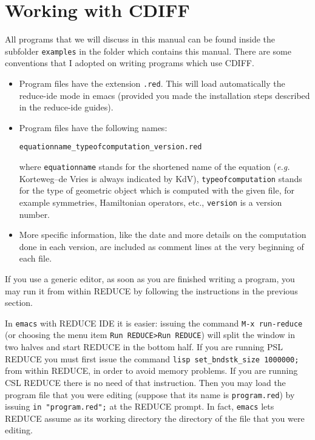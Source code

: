 \documentclass[12pt]{amsart}
\theoremstyle{definition}
\newcommand{\cdiff}{CDIFF\xspace}
\newcommand{\reduce}{REDUCE\xspace}
\begin{document}
\section{Working with \cdiff}

All programs that we will discuss in this manual can be found inside the
subfolder \texttt{examples} in the folder which contains this manual.  There
are some conventions that I adopted on writing programs which use \cdiff.
\begin{itemize}
\item Program files have the extension \texttt{.red}. This will load
  automatically the reduce-ide mode in emacs (provided you made the
  installation steps described in the reduce-ide guides).
\item Program files have the following names:
  \begin{center}
    \texttt{equationname\_typeofcomputation\_version.red}
  \end{center}
  where \texttt{equationname} stands for the shortened name of the equation
  (\emph{e.g.} Korteweg--de Vries is always indicated by KdV),
  \texttt{typeofcomputation} stands for the type of geometric object which is
  computed with the given file, for example symmetries, Hamiltonian operators,
  etc., \texttt{version} is a version number.
\item More specific information, like the date and more details on the
  computation done in each version, are included as comment lines at the very
  beginning of each file.
\end{itemize}

If you use a generic editor, as soon as you are finished writing a program, you
may run it from within \reduce by following the instructions in the previous
section.

In \texttt{emacs} with \reduce IDE it is easier: issuing the command
\texttt{M-x run-reduce} (or choosing the menu item \texttt{Run REDUCE>Run
  REDUCE}) will split the window in two halves and start \reduce in the bottom
half. If you are running PSL \reduce you must first issue the command
\texttt{lisp set\_bndstk\_size 1000000;} from within \reduce, in order to avoid
memory problems. If you are running CSL \reduce there is no need of that
instruction. Then you may load the program file that you were editing (suppose
that its name is \texttt{program.red}) by issuing \texttt{in "program.red";} at
the \reduce prompt. In fact, \texttt{emacs} lets \reduce assume as its working
directory the directory of the file that you were editing.
\end{document}
